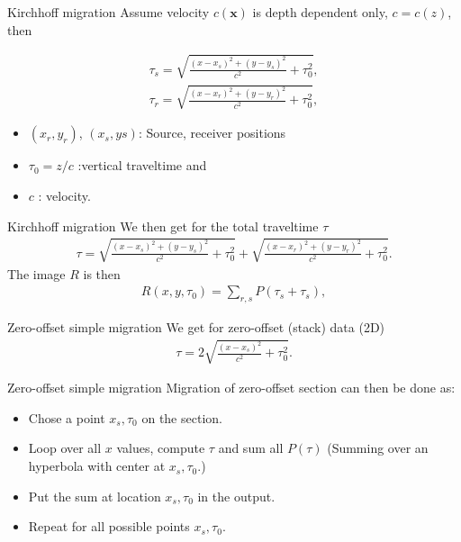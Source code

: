 \documentclass[xcolor=dvipsnames,notes]{beamer}
\begin{document}
\begin{frame}{Kirchhoff migration}
Assume velocity $c(\mathbf{x})$ is depth
dependent only, $c=c(z)$, then

\begin{eqnarray}
\tau_s = \sqrt{\frac{(x-x_s)^2+(y-y_s)^2}{c^2} + \tau^2_0} ,\nonumber\\
\tau_r = \sqrt{\frac{(x-x_r)^2+(y-y_r)^2}{c^2}+\tau^2_0} ,
\end{eqnarray}
\begin{itemize}
\item $(x_r,y_r)$, $(x_s,ys)$: Source, receiver positions
\item $\tau_0=z/c$ :vertical traveltime and 
\item $c$ : velocity.
\end{itemize}
\end{frame}
\begin{frame}{Kirchhoff migration}
We then get for the total traveltime $\tau$ 
\begin{eqnarray}
 \tau=\sqrt{\frac{(x-x_s)^2+(y-y_s)^2}{c^2}+\tau^2_0}+ \sqrt{\frac{(x-x_r)^2+(y-y_r)^2}{c^2}+\tau^2_0}.
\label{eq:si-7}
\end{eqnarray}
The image $R$ is then
\begin{eqnarray}
 R(x,y,\tau_0)= \sum_{r,s}P(\tau_s+\tau_s),
   \label{eq:si-8}
\end{eqnarray}
\end{frame}
\begin{frame}{Zero-offset simple migration}
We get for zero-offset (stack) data
(2D)
\begin{eqnarray}
 \tau=2\sqrt{\frac{(x-x_s)^2}{c^2}+\tau^2_0}.
\label{eq:si-7}
\end{eqnarray}
\end{frame}
\begin{frame}{Zero-offset simple migration}
Migration of zero-offset section can then be done as:
\begin{itemize}
   \item Chose a point $x_s,\tau_0$ on the section.
   \item Loop over all $x$ values, compute $\tau$ and sum
         all $P(\tau)$ (Summing over an hyperbola
         with center at $x_s,\tau_0$.)
   \item Put the sum at location $x_s,\tau_0$ in the output.
   \item Repeat for all possible points $x_s,\tau_0$.
\end{itemize}
\end{frame}
\end{document}
